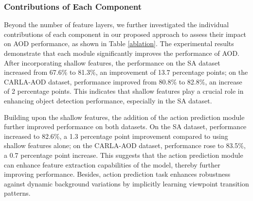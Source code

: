 \documentclass[lettersize,journal]{IEEEtran}
\begin{document}
\subsubsection{Contributions of Each Component}
Beyond the number of feature layers, we further investigated the individual contributions of each component in our proposed approach to assess their impact on AOD performance, as shown in Table \ref{ablation}. The experimental results demonstrate that each module significantly improves the performance of AOD. After incorporating shallow features, the performance on the SA dataset increased from 67.6\% to 81.3\%, an improvement of 13.7 percentage points; on the CARLA-AOD dataset, performance improved from 80.8\% to 82.8\%, an increase of 2 percentage points. This indicates that shallow features play a crucial role in enhancing object detection performance, especially in the SA dataset.

\begin{table}[!]
  \centering
  \caption{mAP Performance of Ablation Experiment on Components of Models.}
  \label{ablation}%
\end{table}%

Building upon the shallow features, the addition of the action prediction module further improved performance on both datasets. On the SA dataset, performance increased to 82.6\%, a 1.3 percentage point improvement compared to using shallow features alone; on the CARLA-AOD dataset, performance rose to 83.5\%, a 0.7 percentage point increase. This suggests that the action prediction module can enhance feature extraction capabilities of the model, thereby further improving performance. Besides, action prediction task enhances robustness against dynamic background variations by implicitly learning viewpoint transition patterns.
\end{document}

